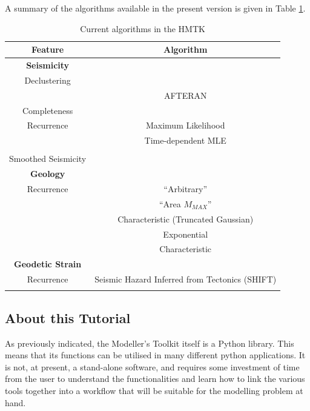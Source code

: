 A summary of the algorithms available in the present version is given in Table \ref{tab:current_features}.
\begin{table}
\centering
\begin{tabular}{|c|c|} \hline
\textbf{Feature} & \textbf{Algorithm}\\ \hline
\textbf{Seismicity} & \\ \hline
Declustering & \textcite{GardnerKnopoff1974}  \\
    & AFTERAN \parencite{Musson1999} \\ \hline
Completeness & \textcite{Stepp1971}\\ \hline
Recurrence & Maximum Likelihood \parencite{Aki1965}\\
 & Time-dependent MLE\\
 & \textcite{Weichert1980}\\ \hline
 Smoothed Seismicity & \textcite{frankel1995} \\ \hline
 \textbf{Geology} & \\ \hline
 Recurrence & \textcite{AndersonLuco1983} ``Arbitrary''\\
  & \textcite{AndersonLuco1983} ``Area $M_{MAX}$''\\
  & Characteristic (Truncated Gaussian) \\
  & \textcite{YoungsCoppersmith1985} Exponential\\
  & \textcite{YoungsCoppersmith1985} Characteristic\\ \hline
 \textbf{Geodetic Strain} & \\ \hline
 Recurrence & Seismic Hazard Inferred from Tectonics (SHIFT) \\
           &  \textcite{BirdLiu2007, Bird_etal2010} \\ \hline
\end{tabular}
\caption{Current algorithms in the HMTK}
\label{tab:current_features}
\end{table}

\subsection{About this Tutorial}

As previously indicated, the Modeller's Toolkit itself is a Python library. This means that its functions can be utilised in many different python applications. It is not, at present, a stand-alone software, and requires some investment of time from the user to understand the functionalities and learn how to link the various tools together into a workflow that will be suitable for the modelling problem at hand.

